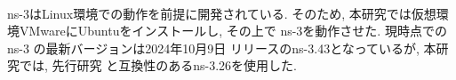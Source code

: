 \\[0.5em]
\indent ns-3はLinux環境での動作を前提に開発されている. そのため, 
本研究では仮想環境VMwareにUbuntuをインストールし, その上で
ns-3を動作させた. 現時点での ns-3 の最新バージョンは2024年10月9日
リリースのns-3.43となっているが, 本研究では, 先行研究
\cite{shinato}と互換性のあるns-3.26を使用した. \\[1em]